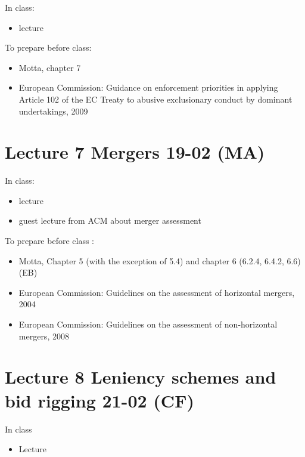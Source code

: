 \documentclass[]{book}
\providecommand{\tightlist}{%
  \setlength{\itemsep}{0pt}\setlength{\parskip}{0pt}}
\begin{document}
In class:

\begin{itemize}
\tightlist
\item
  lecture
\end{itemize}

To prepare before class:

\begin{itemize}
\tightlist
\item
  Motta, chapter 7
\item
  European Commission: Guidance on enforcement priorities in applying
  Article 102 of the EC Treaty to abusive exclusionary conduct by
  dominant undertakings, 2009
\end{itemize}

\section{Lecture 7 Mergers 19-02 (MA)}\label{lecture-7-mergers-19-02-ma}

In class:

\begin{itemize}
\tightlist
\item
  lecture
\item
  guest lecture from ACM about merger assessment
\end{itemize}

To prepare before class :

\begin{itemize}
\tightlist
\item
  Motta, Chapter 5 (with the exception of 5.4) and chapter 6 (6.2.4,
  6.4.2, 6.6) (EB)
\item
  European Commission: Guidelines on the assessment of horizontal
  mergers, 2004
\item
  European Commission: Guidelines on the assessment of non-horizontal
  mergers, 2008
\end{itemize}

\section{Lecture 8 Leniency schemes and bid rigging 21-02
(CF)}\label{lecture-8-leniency-schemes-and-bid-rigging-21-02-cf}

In class

\begin{itemize}
\tightlist
\item
  Lecture
\end{itemize}
\end{document}
